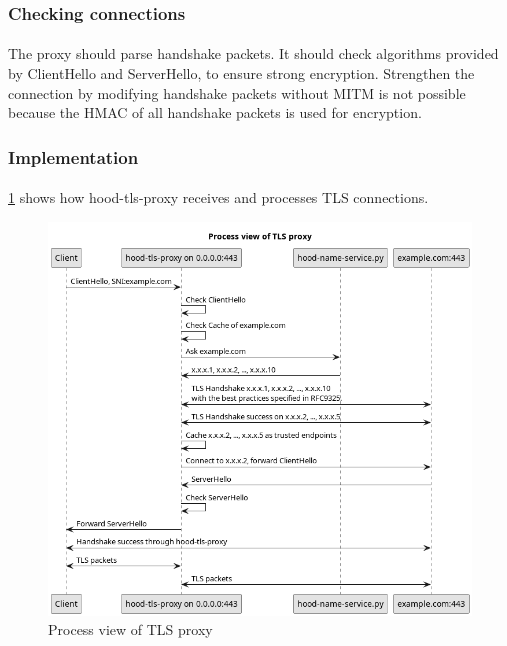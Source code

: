 \documentclass[mscthesis]{usiinfthesis}
\begin{document}
\subsubsection{Checking connections}
\paragraph{}
The proxy should parse handshake packets. It should check algorithms provided by ClientHello and ServerHello, to ensure strong encryption. Strengthen the connection by modifying handshake packets without MITM is not possible because the HMAC of all handshake packets is used for encryption.

\subsubsection{Implementation}
\paragraph{}
\cref{fig:tls-proxy-process-view} shows how hood-tls-proxy receives and processes TLS connections.
\begin{figure}[H]
  \includegraphics[width=\textwidth]{graphics/puml/process-tls-proxy.png}
  \caption{Process view of TLS proxy}
  \label{fig:tls-proxy-process-view}
\end{figure}
\end{document}
